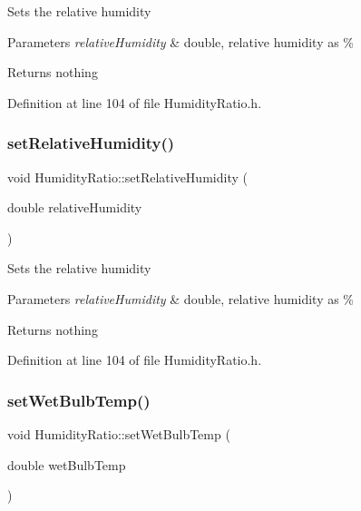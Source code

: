 Sets the relative humidity


\begin{DoxyParams}{Parameters}
{\em relative\+Humidity} & double, relative humidity as \%\\
\hline
\end{DoxyParams}
\begin{DoxyReturn}{Returns}
nothing 
\end{DoxyReturn}


Definition at line 104 of file Humidity\+Ratio.\+h.

\mbox{\label{class_humidity_ratio_a110aecb6587a836ab76d4aca840e5759}} 
\subsubsection{\texorpdfstring{set\+Relative\+Humidity()}{setRelativeHumidity()}\hspace{0.1cm}{\footnotesize\ttfamily [3/3]}}
{\footnotesize\ttfamily void Humidity\+Ratio\+::set\+Relative\+Humidity (\begin{DoxyParamCaption}\item[{double}]{relative\+Humidity }\end{DoxyParamCaption})\hspace{0.3cm}{\ttfamily [inline]}}

Sets the relative humidity


\begin{DoxyParams}{Parameters}
{\em relative\+Humidity} & double, relative humidity as \%\\
\hline
\end{DoxyParams}
\begin{DoxyReturn}{Returns}
nothing 
\end{DoxyReturn}


Definition at line 104 of file Humidity\+Ratio.\+h.

\mbox{\label{class_humidity_ratio_a5bda925f783cb4cef848245b00e28e29}} 
\subsubsection{\texorpdfstring{set\+Wet\+Bulb\+Temp()}{setWetBulbTemp()}\hspace{0.1cm}{\footnotesize\ttfamily [1/3]}}
{\footnotesize\ttfamily void Humidity\+Ratio\+::set\+Wet\+Bulb\+Temp (\begin{DoxyParamCaption}\item[{double}]{wet\+Bulb\+Temp }\end{DoxyParamCaption})\hspace{0.3cm}{\ttfamily [inline]}}

